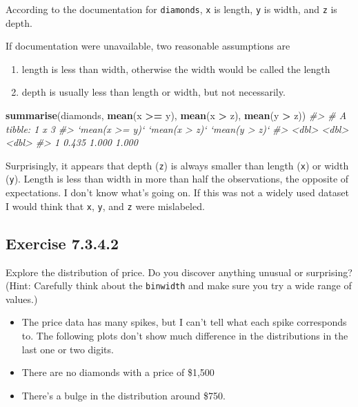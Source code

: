 \documentclass[]{book}
\newenvironment{Shaded}{\begin{snugshade}}{\end{snugshade}}
\newcommand{\CommentTok}[1]{\textcolor[rgb]{0.56,0.35,0.01}{\textit{#1}}}
\newcommand{\KeywordTok}[1]{\textcolor[rgb]{0.13,0.29,0.53}{\textbf{#1}}}
\newcommand{\NormalTok}[1]{#1}
\newcommand{\OperatorTok}[1]{\textcolor[rgb]{0.81,0.36,0.00}{\textbf{#1}}}
\newcommand{\StringTok}[1]{\textcolor[rgb]{0.31,0.60,0.02}{#1}}
\providecommand{\tightlist}{%
  \setlength{\itemsep}{0pt}\setlength{\parskip}{0pt}}
\theoremstyle{plain}
\theoremstyle{remark}
\begin{document}
According to the documentation for \texttt{diamonds}, \texttt{x} is length,
\texttt{y} is width, and \texttt{z} is depth.

If documentation were unavailable, two reasonable assumptions are

\begin{enumerate}
\def\labelenumi{\arabic{enumi}.}
\tightlist
\item
  length is less than width, otherwise the width would be called the length
\item
  depth is usually less than length or width, but not necessarily.
\end{enumerate}

\begin{Shaded}
\begin{Highlighting}[]
\KeywordTok{summarise}\NormalTok{(diamonds, }\KeywordTok{mean}\NormalTok{(x }\OperatorTok{>=}\StringTok{ }\NormalTok{y), }\KeywordTok{mean}\NormalTok{(x }\OperatorTok{>}\StringTok{ }\NormalTok{z), }\KeywordTok{mean}\NormalTok{(y }\OperatorTok{>}\StringTok{ }\NormalTok{z))}
\CommentTok{#> # A tibble: 1 x 3}
\CommentTok{#>   `mean(x >= y)` `mean(x > z)` `mean(y > z)`}
\CommentTok{#>            <dbl>         <dbl>         <dbl>}
\CommentTok{#> 1          0.435         1.000         1.000}
\end{Highlighting}
\end{Shaded}

Surprisingly, it appears that depth (\texttt{z}) is always smaller than
length (\texttt{x}) or width (\texttt{y}). Length is less than width in more than half the observations, the opposite of expectations.
I don't know what's going on. If this was not a widely used dataset
I would think that \texttt{x}, \texttt{y}, and \texttt{z} were mislabeled.

\hypertarget{exercise-7.3.4.2}{%
\subsection*{\texorpdfstring{Exercise {7.3.4.2}}{Exercise 7.3.4.2}}\label{exercise-7.3.4.2}}

Explore the distribution of price. Do you discover anything unusual or surprising? (Hint: Carefully think about the \texttt{binwidth} and make sure you try a wide range of values.)

\begin{itemize}
\tightlist
\item
  The price data has many spikes, but I can't tell what each spike corresponds to. The following plots don't show much difference in the distributions in the last one or two digits.
\item
  There are no diamonds with a price of \$1,500
\item
  There's a bulge in the distribution around \$750.
\end{itemize}
\end{document}
